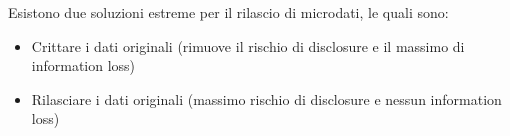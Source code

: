 Esistono due soluzioni estreme per il rilascio di microdati, le quali sono: 
\begin{itemize}
    \item Crittare i dati originali (rimuove il rischio di disclosure e il massimo di information loss)
    \item Rilasciare i dati originali (massimo rischio di disclosure e nessun information loss)
\end{itemize}